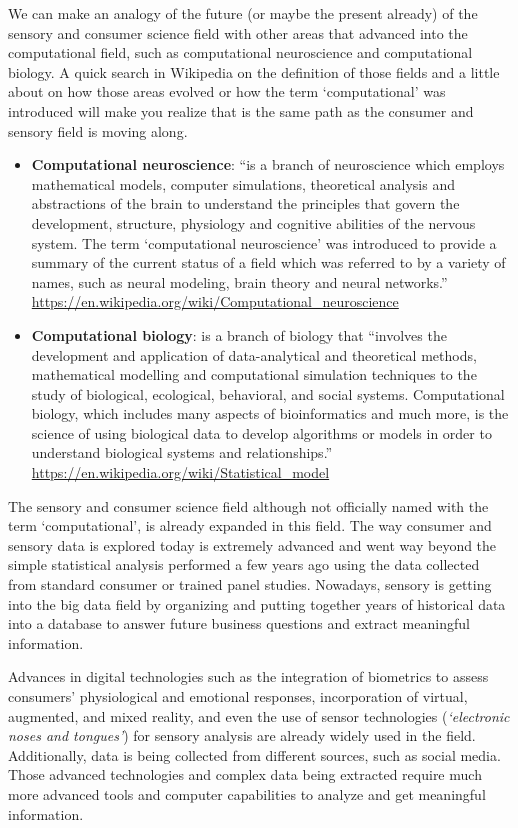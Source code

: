 \documentclass[
]{krantz}
\begin{document}
We can make an analogy of the future (or maybe the present already) of the sensory and consumer science field with other areas that advanced into the computational field, such as computational neuroscience and computational biology. A quick search in Wikipedia on the definition of those fields and a little about on how those areas evolved or how the term `computational' was introduced will make you realize that is the same path as the consumer and sensory field is moving along.

\begin{itemize}
\item
  \textbf{Computational neuroscience}: ``is a branch of neuroscience which employs mathematical models, computer simulations, theoretical analysis and abstractions of the brain to understand the principles that govern the development, structure, physiology and cognitive abilities of the nervous system. The term `computational neuroscience' was introduced to provide a summary of the current status of a field which was referred to by a variety of names, such as neural modeling, brain theory and neural networks.'' \url{https://en.wikipedia.org/wiki/Computational_neuroscience}
\item
  \textbf{Computational biology}: is a branch of biology that ``involves the development and application of data-analytical and theoretical methods, mathematical modelling and computational simulation techniques to the study of biological, ecological, behavioral, and social systems. Computational biology, which includes many aspects of bioinformatics and much more, is the science of using biological data to develop algorithms or models in order to understand biological systems and relationships.'' \url{https://en.wikipedia.org/wiki/Statistical_model}
\end{itemize}

The sensory and consumer science field although not officially named with the term `computational', is already expanded in this field. The way consumer and sensory data is explored today is extremely advanced and went way beyond the simple statistical analysis performed a few years ago using the data collected from standard consumer or trained panel studies. Nowadays, sensory is getting into the big data field by organizing and putting together years of historical data into a database to answer future business questions and extract meaningful information.

Advances in digital technologies such as the integration of biometrics to assess consumers' physiological and emotional responses, incorporation of virtual, augmented, and mixed reality, and even the use of sensor technologies (\emph{`electronic noses and tongues'}) for sensory analysis are already widely used in the field. Additionally, data is being collected from different sources, such as social media. Those advanced technologies and complex data being extracted require much more advanced tools and computer capabilities to analyze and get meaningful information.
\end{document}
